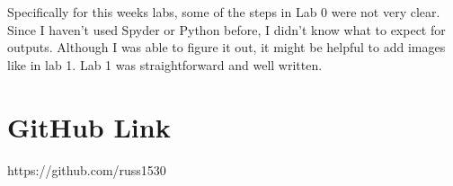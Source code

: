 \documentclass[12pt, titlepage]{article}
\begin{document}
        Specifically for this weeks labs, some of the steps in Lab 0 were not very clear. Since I haven't used Spyder or Python before, I didn't know what to expect for outputs.  Although I was able to figure it out, it might be helpful to add images like in lab 1.  Lab 1 was straightforward and well written.  

	\section{GitHub Link}
        https://github.com/russ1530
\end{document}
